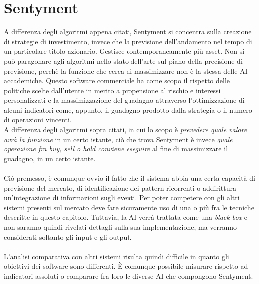 \documentclass[a4paper,12pt]{report}
\begin{document}
\newpage
\section{Sentyment}
A differenza degli algoritmi appena citati, Sentyment si concentra sulla creazione di strategie di investimento, invece che la previsione dell'andamento nel tempo di un particolare titolo azionario. Gestisce contemporaneamente più asset. Non si può paragonare agli algoritmi nello stato dell'arte sul piano della precisione di previsione, perchè la funzione che cerca di massimizzare non è la stessa delle AI accademiche. Questo software commerciale ha come scopo il rispetto delle politiche scelte dall'utente in merito a propensione al rischio e interessi personalizzati e la massimizzazione del guadagno attraverso l'ottimizzazione di alcuni indicatori come, appunto, il guadagno prodotto dalla strategia o il numero di operazioni vincenti.\\ A differenza degli algoritmi sopra citati, in cui lo scopo è \textit{prevedere quale valore avrà la funzione} in un certo istante, ciò che trova Sentyment è invece \textit{quale operazione fra buy, sell o hold conviene eseguire} al fine di massimizzare il guadagno, in un certo istante.\\~\\
Ciò premesso, è comunque ovvio il fatto che il sistema abbia una certa capacità di previsione del mercato, di identificazione dei pattern ricorrenti o addirittura un'integrazione di informazioni sugli eventi. Per poter competere con gli altri sistemi presenti sul mercato deve fare sicuramente uso di una o più fra le tecniche descritte in questo capitolo. Tuttavia, la AI verrà trattata come una \textit{black-box} e non saranno quindi rivelati dettagli sulla sua implementazione, ma verranno considerati soltanto gli input e gli output.\\~\\ L'analisi comparativa con altri sistemi risulta quindi difficile in quanto gli obiettivi dei software sono differenti. È comunque possibile misurare rispetto ad indicatori assoluti o comparare fra loro le diverse AI che compongono Sentyment.
\end{document}
